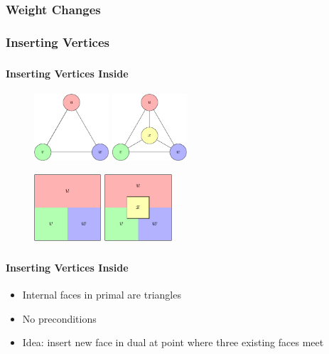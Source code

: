 \documentclass[t,18pt]{beamer}
\begin{document}
\subsubsection{Weight Changes}
\label{subsubsect:weight-changes}

\subsubsection{Inserting Vertices}
\label{subsubsect:inserting-vertices}

\begin{frame}[c]
  \frametitle{}
  \framesubtitle{Inserting Vertices Inside}
  \begin{figure}
    \includegraphics[height=2.5cm]{../Thesis/Resources/InsertVertex-Example-Inside-1.pdf}
    \quad
    \includegraphics[height=2.5cm]{../Thesis/Resources/InsertVertex-Example-Inside-2.pdf}
  \end{figure}
  \begin{figure}
    \includegraphics[height=2.5cm]{../Thesis/Resources/InsertVertex-Example-Inside-3.pdf}
    \qquad
    \includegraphics[height=2.5cm]{../Thesis/Resources/InsertVertex-Example-Inside-4.pdf}
  \end{figure}
\end{frame}

\begin{frame}
  \frametitle{}
  \framesubtitle{Inserting Vertices Inside}
  \begin{itemize}
    \item Internal faces in primal are triangles
    \item No preconditions
    \vspace{1cm}
    \item<2-> Idea: insert new face in dual at point where three existing faces meet
  \end{itemize}
\end{frame}
\end{document}
